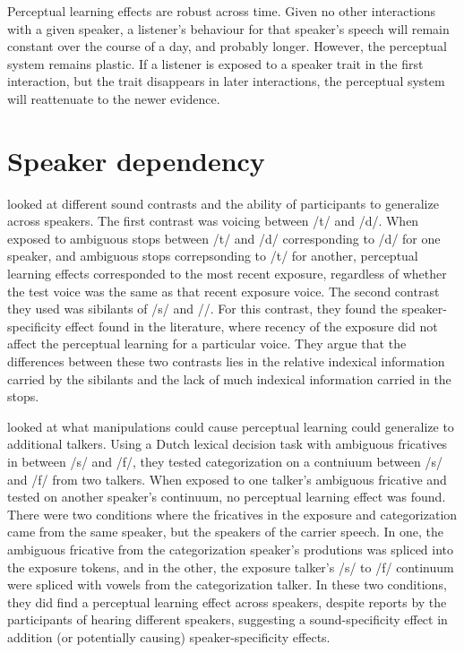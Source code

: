 Perceptual learning effects are robust across time.  
Given no other interactions with a given speaker, a listener's behaviour for that speaker's speech will remain constant over the course of a day, and probably longer. 
However, the perceptual system remains plastic.  
If a listener is exposed to a speaker trait in the first interaction, but the trait disappears in later interactions, the perceptual system will reattenuate to the newer evidence.

\section{Speaker dependency}

\citet{Kraljic2007} looked at different sound contrasts and the ability of participants to generalize across speakers.  
The first contrast was voicing between /t/ and /d/.  
When exposed to ambiguous stops between /t/ and /d/ corresponding to /d/ for one speaker, and ambiguous stops correpsonding to /t/ for another, perceptual learning effects corresponded to the most recent exposure, regardless of whether the test voice was the same as that recent exposure voice.  
The second contrast they used was sibilants of /s/ and /\textesh/. 
 For this contrast, they found the speaker-specificity effect found in the literature, where recency of the exposure did not affect the perceptual learning for a particular voice.  They argue that the differences between these two contrasts lies in the relative indexical information carried by the sibilants and the lack of much indexical information carried in the stops.

\citet{Eisner2005} looked at what manipulations could cause perceptual learning could generalize to additional talkers.  
Using a Dutch lexical decision task with ambiguous fricatives in between /s/ and /f/, they tested categorization on a contniuum between /s/ and /f/ from two talkers.  
When exposed to one talker's ambiguous fricative and tested on another speaker's continuum, no perceptual learning effect was found.  
There were two conditions where the fricatives in the exposure and categorization came from the same speaker, but the speakers of the carrier speech.  
In one, the ambiguous fricative from the categorization speaker's produtions was spliced into the exposure tokens, and in the other, the exposure talker's /s/ to /f/ continuum were spliced with vowels from the categorization talker.
In these two conditions, they did find a perceptual learning effect across speakers, despite reports by the participants of hearing different speakers, suggesting a sound-specificity effect in addition (or potentially causing) speaker-specificity effects. 

